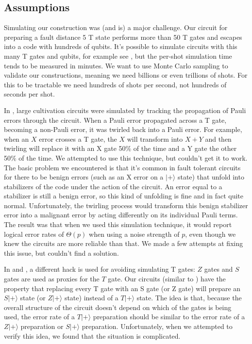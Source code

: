 \documentclass[onecolumn,unpublished,a4paper]{quantumarticle}
\theoremstyle{definition}
\begin{document}
\subsection{Assumptions}

Simulating our construction was (and is) a major challenge.
Our circuit for preparing a fault distance 5 T state performs more than 50 T gates and escapes into a code with hundreds of qubits.
It's possible to simulate circuits with this many T gates and qubits, for example see \cite{kissinger2022zxtsim}, but the per-shot simulation time tends to be measured in minutes.
We want to use Monte Carlo sampling to validate our constructions, meaning we need billions or even trillions of shots.
For this to be tractable we need hundreds of shots per second, not hundreds of seconds per shot.

In \cite{chamberland2020colorinjection}, large cultivation circuits were simulated by tracking the propagation of Pauli errors through the circuit.
When a Pauli error propagated across a T gate, becoming a non-Pauli error, it was twirled back into a Pauli error.
For example, when an $X$ error crosses a T gate, the $X$ will transform into $X+Y$ and then twirling will replace it with an X gate 50\% of the time and a Y gate the other 50\% of the time.
We attempted to use this technique, but couldn't get it to work.
The basic problem we encountered is that it's common in fault tolerant circuits for there to be benign errors (such as an X error on a $|+\rangle$ state) that unfold into stabilizers of the code under the action of the circuit.
An error equal to a stabilizer is still a benign error, so this kind of unfolding is fine and in fact quite normal.
Unfortunately, the twirling process would transform this benign stabilizer error into a malignant error by acting differently on its individual Pauli terms.
The result was that when we used this simulation technique, it would report logical error rates of $\Theta(p)$ when using a noise strength of $p$, even though we knew the circuits are more reliable than that.
We made a few attempts at fixing this issue, but couldn't find a solution.

In \cite{gidney2023hook} and \cite{zhou2024constantdepth}, a different hack is used for avoiding simulating T gates: $Z$ gates and $S$ gates are used as proxies for the $T$ gate.
Our circuits (similar to \cite{gidney2023hook,zhou2024constantdepth}) have the property that replacing every T gate with an S gate (or Z gate) will prepare an $S|+\rangle$ state (or $Z|+\rangle$ state) instead of a $T|+\rangle$ state.
The idea is that, because the overall structure of the circuit doesn't depend on which of the gates is being used, the error rate of a $T|+\rangle$ preparation should be similar to the error rate of a $Z|+\rangle$ preparation or $S|+\rangle$ preparation.
Unfortunately, when we attempted to verify this idea, we found that the situation is complicated.
\end{document}
